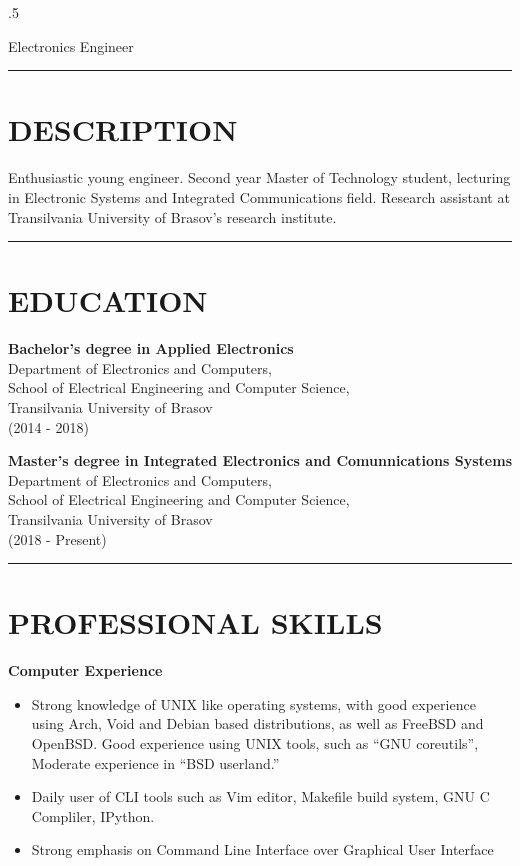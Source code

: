 \documentclass{resume}
\begin{document}
 
\thispagestyle{empty} %
\address{Str. Galaxiei, Nr. 4, Bl. 29, Sc. C\\
Brasov, Romania\\  +40 (0731) 757 891}


\begin{resume}
\vspace{0.1in}
\moveleft.5\sectionwidth\centerline{Electronics Engineer}  

\noindent\rule{\textwidth}{0.4pt}
\section{DESCRIPTION}
\vspace{0.1in} 
 
    Enthusiastic young engineer.
    Second year Master of Technology student, lecturing in Electronic Systems and Integrated Communications field.
    Research assistant at Transilvania University of Brasov's research institute. 

\noindent\rule{\textwidth}{0.4pt}
\section{EDUCATION}
\vspace{0.1in} 
 
    {\bf Bachelor's degree in Applied Electronics}\\ 
    Department of Electronics and Computers,\\ 
    School of Electrical Engineering and Computer Science,\\ 
    Transilvania University of Brasov\\
    (2014 - 2018)

    {\bf Master's degree in Integrated Electronics and Comunnications Systems}\\
    Department of Electronics and Computers,\\
    School of Electrical Engineering and Computer Science,\\
    Transilvania University of Brasov\\
    (2018 - Present)
 
\noindent\rule{\textwidth}{0.4pt}
\section{PROFESSIONAL SKILLS} 
\vspace{0.1in}
   {\bf Computer Experience} 
        \begin{itemize}
        \item[] Strong knowledge of UNIX like operating systems, 
        with good experience using Arch, Void and Debian based distributions, as well as FreeBSD and OpenBSD.
        Good experience using UNIX tools, such as ``GNU coreutils'',
        Moderate experience in ``BSD userland.''
        \item[] Daily user of CLI tools such as Vim editor, Makefile build system, GNU C Compliler, IPython. 
        \item[] Strong emphasis on Command Line Interface over Graphical User Interface
        \end{itemize}
        

\end{resume}
\end{document}
